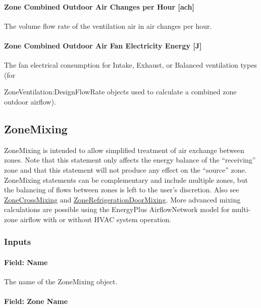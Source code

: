 \paragraph{Zone Combined Outdoor Air Changes per Hour {[}ach{]}}\label{zone-combined-outdoor-air-changes-per-hour-ach}

The volume flow rate of the ventilation air in air changes per hour.

\paragraph{Zone Combined Outdoor Air Fan Electricity Energy {[}J{]}}\label{zone-combined-outdoor-air-fan-electric-energy-j}

The fan electrical consumption for Intake, Exhaust, or Balanced ventilation types (for

ZoneVentilation:DesignFlowRate objects used to calculate a combined zone outdoor airflow).

\subsection{ZoneMixing}\label{zonemixing}

ZoneMixing is intended to allow simplified treatment of air exchange between zones. Note that this statement only affects the energy balance of the ``receiving'' zone and that this statement will not produce any effect on the ``source'' zone. ZoneMixing statements can be complementary and include multiple zones, but the balancing of flows between zones is left to the user's discretion. Also see \hyperref[zonecrossmixing]{ZoneCrossMixing} and \hyperref[zonerefrigerationdoormixing]{ZoneRefrigerationDoorMixing}. More advanced mixing calculations are possible using the EnergyPlus AirflowNetwork model for multi-zone airflow with or without HVAC system operation.

\subsubsection{Inputs}\label{inputs-5-004}

\paragraph{Field: Name}\label{field-name-5-004}

The name of the ZoneMixing object.

\paragraph{Field: Zone Name}\label{field-zone-name-3}

